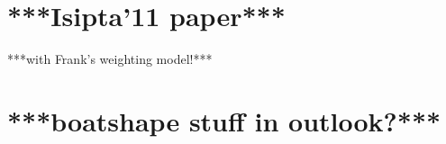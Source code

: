 \section{***Isipta'11 paper***}
\label{sec:isipta11}


***with Frank's weighting model!***


\section{***boatshape stuff in outlook?***}



